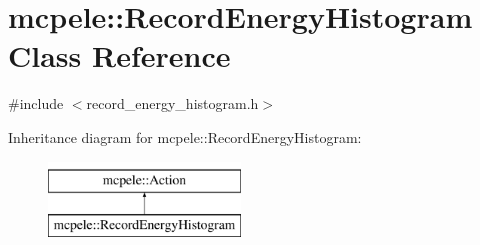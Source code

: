 \hypertarget{classmcpele_1_1RecordEnergyHistogram}{\section{mcpele\-:\-:\-Record\-Energy\-Histogram \-Class \-Reference}
\label{classmcpele_1_1RecordEnergyHistogram}
}


{\ttfamily \#include $<$record\-\_\-energy\-\_\-histogram.\-h$>$}

\-Inheritance diagram for mcpele\-:\-:\-Record\-Energy\-Histogram\-:\begin{figure}[H]
\begin{center}
\leavevmode
\includegraphics[height=2.000000cm]{classmcpele_1_1RecordEnergyHistogram}
\end{center}
\end{figure}
